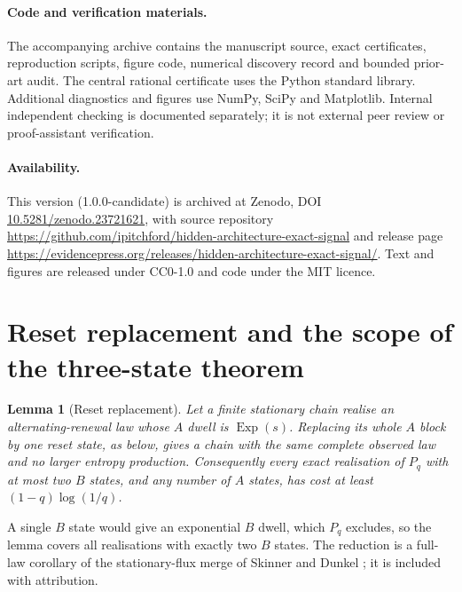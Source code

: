 \documentclass[11pt,a4paper]{article}
\newtheorem{lemma}[theorem]{Lemma}
\theoremstyle{remark}\newtheorem{remark}[theorem]{Remark}
\newcommand{\Exp}{\operatorname{Exp}}
\begin{document}
\paragraph{Code and verification materials.}
The accompanying archive contains the manuscript source, exact certificates,
reproduction scripts, figure code, numerical discovery record and bounded
prior-art audit. The central rational certificate uses the Python standard
library. Additional diagnostics and figures use NumPy, SciPy and Matplotlib.
Internal independent checking is documented separately; it is not external
peer review or proof-assistant verification.

\paragraph{Availability.}
This version (1.0.0-candidate) is archived at Zenodo, DOI
\href{https://doi.org/10.5281/zenodo.23721621}{10.5281/zenodo.23721621}, with source repository
\url{https://github.com/ipitchford/hidden-architecture-exact-signal} and release page
\url{https://evidencepress.org/releases/hidden-architecture-exact-signal/}. Text and figures are
released under CC0-1.0 and code under the MIT licence.

\appendix
\section{Reset replacement and the scope of the three-state theorem}
\label{app:reset}

\begin{lemma}[Reset replacement]\label{lem:reset}
Let a finite stationary chain realise an alternating-renewal law whose $A$
dwell is $\Exp(s)$. Replacing its whole $A$ block by one reset state, as
below, gives a chain with the same complete observed law and no larger
entropy production. Consequently every exact realisation of $P_q$ with at
most two $B$ states, and any number of $A$ states, has cost at least
$(1-q)\log(1/q)$.
\end{lemma}
A single $B$ state would give an exponential $B$ dwell, which $P_q$ excludes,
so the lemma covers all realisations with exactly two $B$ states. The
reduction is a full-law corollary of the stationary-flux merge of Skinner and
Dunkel \cite[Supplementary Lemma 2]{skinner_wait}; it is included with
attribution.
\end{document}
